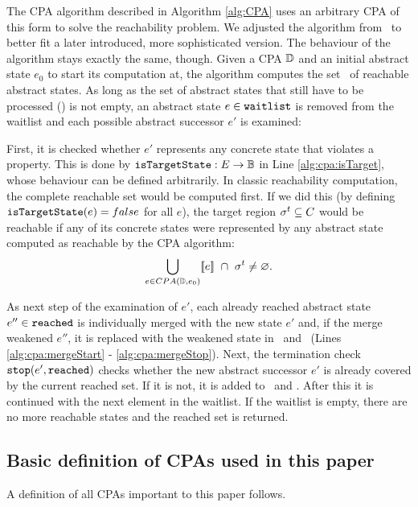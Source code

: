 The CPA algorithm \cite{Beyer2007} described in Algorithm \ref{alg:CPA} uses an arbitrary CPA of this form to solve the reachability problem.
We adjusted the algorithm from \cite{Beyer2007}\ to better fit a later introduced, more sophisticated version. The behaviour of the algorithm stays exactly the same, though.
Given a CPA $\mathbb{D}$ and an initial abstract state $e_0$ to start its computation at, the algorithm computes the set \reachedSet\ of reachable abstract states.
As long as the set of abstract states that still have to be processed (\waitlistSet) is not empty, an abstract state $e \in \texttt{waitlist}$ is removed from the waitlist
and each possible abstract successor $e'$ is examined:

First, it is checked whether $e'$ represents any concrete state that violates a property. This is done by $\texttt{isTargetState} : E \rightarrow \mathbb{B}$ in Line \ref{alg:cpa:isTarget}, whose behaviour can be defined arbitrarily.
In classic reachability computation, the complete reachable set would be computed first.
If we did this (by defining $\texttt{isTargetState}(e) = false$ for all $e$),
the target region $\sigma^{t} \subseteq C$ would be reachable if any of its concrete states were represented by any abstract state computed as reachable by the CPA algorithm:
\[\bigcup_{e \in CPA(\mathbb{D}, e_0)} [\![ e ]\!]\ \cap\ \sigma^{t} \neq \varnothing .\]

As next step of the examination of $e'$, each already reached abstract state $e'' \in \texttt{reached}$ is individually merged with the new state $e'$ and, if the merge weakened $e''$, it is replaced with the weakened state in \reachedSet\ and \waitlistSet\ (Lines \ref{alg:cpa:mergeStart} - \ref{alg:cpa:mergeStop}).
Next, the termination check $\texttt{stop}(e', \texttt{reached})$ checks whether the new abstract successor $e'$ is already covered by the current reached set.
If it is not, it is added to \waitlistSet\ and \reachedSet.
After this it is continued with the next element in the waitlist.
If the waitlist is empty, there are no more reachable states and the reached set is returned.

\subsection{Basic definition of CPAs used in this paper}
A definition of all CPAs important to this paper follows.

